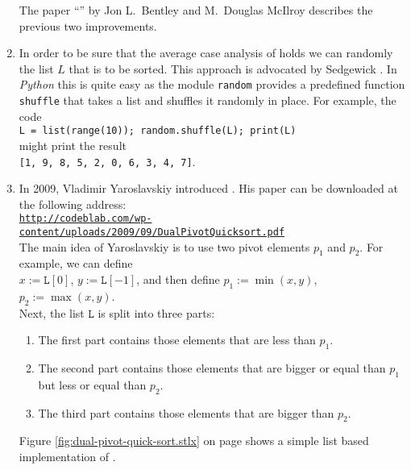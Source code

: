 \begin{enumerate}
      The paper ``'' by Jon L.~Bentley and M.~Douglas McIlroy
      \cite{bentley:93} describes the previous two improvements.
\item In order to be sure that the average case analysis of  holds we can randomly
       the list $L$ that is to be sorted.  This approach is advocated by Sedgewick
      \cite{sedgewick:2011}.  In \textsl{Python} this is quite easy as
      the module \texttt{random} provides a predefined function \texttt{shuffle} that takes a list and shuffles
      it randomly in place.  For example, the code
      \\[0.2cm]
      \hspace*{1.3cm}
      \texttt{L = list(range(10)); random.shuffle(L); print(L)}
      \\[0.2cm]
      might print the result
      \\[0.2cm]
      \hspace*{1.3cm}
      \texttt{[1, 9, 8, 5, 2, 0, 6, 3, 4, 7]}.
\item In 2009, Vladimir Yaroslavskiy introduced 
      \cite{yaroslavskiy:2009}.
      His paper can be
      downloaded at the following address:
      \\[0.2cm]
      \hspace*{1.3cm}
      \href{http://codeblab.com/wp-content/uploads/2009/09/DualPivotQuicksort.pdf}{\texttt{http://codeblab.com/wp-content/uploads/2009/09/DualPivotQuicksort.pdf}}
      \\[0.2cm]
      The main idea of Yaroslavskiy is to use two pivot elements $p_1$ and $p_2$.  For example, we can
      define
      \\[0.2cm]
      \hspace*{1.3cm}
      $x := \mathtt{L}[0]$, $y := \mathtt{L}[-1]$, \quad and then define \quad $p_1 :=\min(x, y)$, $p_2 := \max(x, y)$.
      \\[0.2cm]
      Next, the list $\mathtt{L}$ is split into three parts:
      \begin{enumerate}
      \item The first part contains those elements that are less than $p_1$.
      \item The second part contains those elements that are bigger or equal than $p_1$ but less or
            equal than $p_2$.
      \item The third part contains those elements that are bigger than $p_2$.
      \end{enumerate}
      Figure \ref{fig:dual-pivot-quick-sort.stlx} on page \pageref{fig:dual-pivot-quick-sort.stlx}
      shows a simple list based implementation of .


\end{enumerate}
